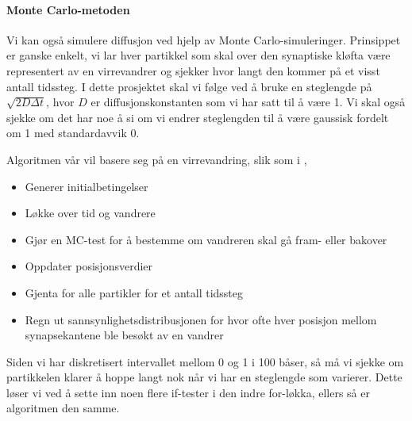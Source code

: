 \documentclass[norsk, 10pt]{article}
\begin{document}
\paragraph{Monte Carlo-metoden}
Vi kan også simulere diffusjon ved hjelp av Monte Carlo-simuleringer. Prinsippet er ganske enkelt, vi lar hver partikkel som skal over den synaptiske kløfta være representert av en virrevandrer og sjekker hvor langt den kommer på et visst antall tidssteg. I dette prosjektet skal vi følge \cite{farnell} ved å bruke en steglengde på $\sqrt{2D\Delta t}$, hvor $D$ er diffusjonskonstanten som vi har satt til å være 1. Vi skal også sjekke om det har noe å si om vi endrer steglengden til å være gaussisk fordelt om 1 med standardavvik 0.

Algoritmen vår vil basere seg på en virrevandring, slik som i \cite{mhj},
\begin{itemize}
\item 
Generer initialbetingelser
\item 
Løkke over tid og vandrere
\item
Gjør en MC-test for å bestemme om vandreren skal gå fram- eller bakover
\item
Oppdater posisjonsverdier
\item
Gjenta for alle partikler for et antall tidssteg
\item
Regn ut sannsynlighetsdistribusjonen for hvor ofte hver posisjon mellom synapsekantene ble besøkt av en vandrer
\end{itemize}

Siden vi har diskretisert intervallet mellom 0 og 1 i 100 båser, så må vi sjekke om partikkelen klarer å hoppe langt nok når vi har en steglengde som varierer. Dette løser vi ved å sette inn noen flere if-tester i den indre for-løkka, ellers så er algoritmen den samme.
\end{document}
